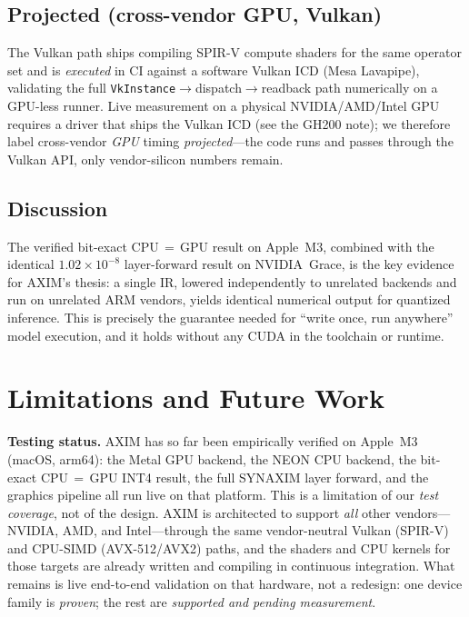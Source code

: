\documentclass[11pt,a4paper]{article}
\begin{document}
\subsection{Projected (cross-vendor GPU, Vulkan)}

The Vulkan path ships compiling SPIR-V compute shaders for the same operator set and is
\emph{executed} in CI against a software Vulkan ICD (Mesa Lavapipe), validating the full
\texttt{VkInstance}$\to$dispatch$\to$readback path numerically on a GPU-less runner. Live
measurement on a physical NVIDIA/AMD/Intel GPU requires a driver that ships the Vulkan ICD
(see the GH200 note); we therefore label cross-vendor \emph{GPU} timing \emph{projected}---the
code runs and passes through the Vulkan API, only vendor-silicon numbers remain.

\subsection{Discussion}

The verified bit-exact CPU\,$=$\,GPU result on Apple~M3, combined with the identical
$1.02\times10^{-8}$ layer-forward result on NVIDIA~Grace, is the key evidence for AXIM's
thesis: a single IR, lowered independently to unrelated backends and run on unrelated ARM
vendors, yields identical numerical output for quantized inference. This is precisely the
guarantee needed for ``write once, run anywhere'' model execution, and it holds without any
CUDA in the toolchain or runtime.

\section{Limitations and Future Work}

\textbf{Testing status.} AXIM has so far been empirically verified on Apple~M3 (macOS,
arm64): the Metal GPU backend, the NEON CPU backend, the bit-exact CPU\,$=$\,GPU INT4
result, the full SYNAXIM layer forward, and the graphics pipeline all run live on that
platform. This is a limitation of our \emph{test coverage}, not of the design. AXIM is
architected to support \emph{all} other vendors---NVIDIA, AMD, and Intel---through the same
vendor-neutral Vulkan (SPIR-V) and CPU-SIMD (AVX-512/AVX2) paths, and the shaders and CPU
kernels for those targets are already written and compiling in continuous integration. What
remains is live end-to-end validation on that hardware, not a redesign: one device family is
\emph{proven}; the rest are \emph{supported and pending measurement}.
\end{document}
